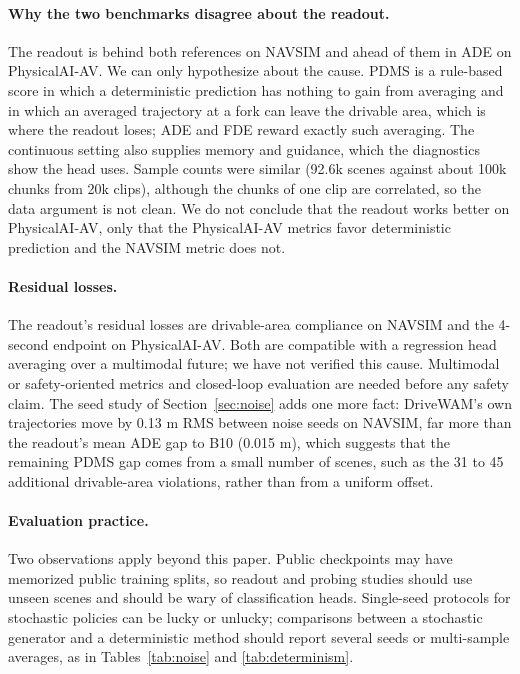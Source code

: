 \documentclass[10pt]{article}
\begin{document}
\paragraph{Why the two benchmarks disagree about the readout.} The readout is behind both references on NAVSIM and ahead of them in ADE on PhysicalAI-AV. We can only hypothesize about the cause. PDMS is a rule-based score in which a deterministic prediction has nothing to gain from averaging and in which an averaged trajectory at a fork can leave the drivable area, which is where the readout loses; ADE and FDE reward exactly such averaging. The continuous setting also supplies memory and guidance, which the diagnostics show the head uses. Sample counts were similar (92.6k scenes against about 100k chunks from 20k clips), although the chunks of one clip are correlated, so the data argument is not clean. We do not conclude that the readout works better on PhysicalAI-AV, only that the PhysicalAI-AV metrics favor deterministic prediction and the NAVSIM metric does not.

\paragraph{Residual losses.} The readout's residual losses are drivable-area compliance on NAVSIM and the 4-second endpoint on PhysicalAI-AV. Both are compatible with a regression head averaging over a multimodal future; we have not verified this cause. Multimodal or safety-oriented metrics and closed-loop evaluation are needed before any safety claim. The seed study of Section~\ref{sec:noise} adds one more fact: DriveWAM's own trajectories move by 0.13 m RMS between noise seeds on NAVSIM, far more than the readout's mean ADE gap to B10 (0.015 m), which suggests that the remaining PDMS gap comes from a small number of scenes, such as the 31 to 45 additional drivable-area violations, rather than from a uniform offset.

\paragraph{Evaluation practice.} Two observations apply beyond this paper. Public checkpoints may have memorized public training splits, so readout and probing studies should use unseen scenes and should be wary of classification heads. Single-seed protocols for stochastic policies can be lucky or unlucky; comparisons between a stochastic generator and a deterministic method should report several seeds or multi-sample averages, as in Tables~\ref{tab:noise} and \ref{tab:determinism}.
\end{document}
